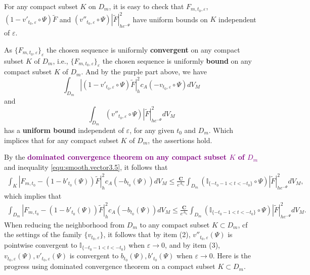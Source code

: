 For any compact subset $K$ on $D_m$, it is easy to check that
$F_{m,t_0,\varepsilon}$,
$(1-v'_{t_0,\varepsilon}\circ\Psi)\tilde{F}$ and
$(v''_{t_0,\varepsilon}\circ\Psi)|\tilde{F}|^{2}_{he^{-\Psi}}$ have
uniform bounds on $K$ independent of $\varepsilon$.
\begin{remark}
  As $\{F_{m,t_0,\varepsilon}\}_{\varepsilon}$  the chosen
  sequence is uniformly \textbf{convergent} on any compact subset $K$ of $D_m$, i.e., $\{F_{m,t_0,\varepsilon}\}_{\varepsilon}$ the chosen
  sequence is uniformly \textbf{bound} on any compact subset $K$ of $D_m$. And by the purple part above, we have $$\int_{D_m}|(1-v'_{t_0,\varepsilon}\circ\Psi)\tilde{F}|^{2}_{h}c_{A}(-v_{t_0,\varepsilon}\circ\Psi)dV_{M}$$
  and
  $$\int_{D_m}(v''_{t_0,\varepsilon}\circ\Psi) |\tilde{F}|^{2}_{he^{-\Psi}}dV_{M}$$
  has a \textbf{uniform bound} independent of $\varepsilon$, for any given
  $t_0$ and $D_m$. Which implices that for any compact subset $K$ of $D_m$, the assertions hold.
\end{remark}
By the \textcolor{purple}{\textbf{dominated convergence theorem on any compact subset $K$ of
$D_m$}} and inequality \ref{equ:smooth.vector3.5}, it follows that
\begin{equation}
\begin{split}
\int_{K}|F_{m,t_0}-(1-b'_{t_0}(\Psi))\tilde{F}|^{2}_{h}c_{A}(-b_{t_0}(\Psi))dV_{M}
\leq\frac{\mathbf{C}}{e^{A_{t_0}}}\int_{D_m}
(\mathbb{I}_{\{-t_{0}-1< t<-t_{0}\}}\circ\Psi)|\tilde{F}|^{2}_{he^{-\Psi}}dV_{M},
\end{split}
\end{equation}
which implies that
\begin{equation}
\label{equ:smooth.vector3.4}
\begin{split}
\int_{ D_m}|F_{m,t_0}-(1-b'_{t_0}(\Psi))\tilde{F}|^{2}_{h}c_{A}(-b_{t_0}(\Psi))dV_{M}
\leq\frac{\mathbf{C}}{e^{A_{t_0}}}\int_{D_m}(\mathbb{I}_{\{-t_{0}-1< t<-t_{0}\}}
\circ\Psi)|\tilde{F}|^{2}_{he^{-\Psi}}dV_{M}.
\end{split}
\end{equation}
When reducing the neighborhood  from $D_m$ to any compact subset $K\subset D_m$, cf the settings of the family $\{v_{t_0,\varepsilon}\}$, it follows that by item (2), $v''_{t_0,\varepsilon}(\Psi)$ is pointwise convergent to $\mathbb{I}_{\{-t_0-1<t<-t_0\}}$ when $\varepsilon\to 0$, and by item (3), $v_{t_0,\varepsilon}(\Psi),v'_{t_0,\varepsilon}(\Psi)$ is convergent to $b_{t_0}(\Psi),b'_{t_0}(\Psi)$ when $\varepsilon\to 0$. Here is the progress using dominated convergence theorem on a compact subset $K\subset D_m$.
